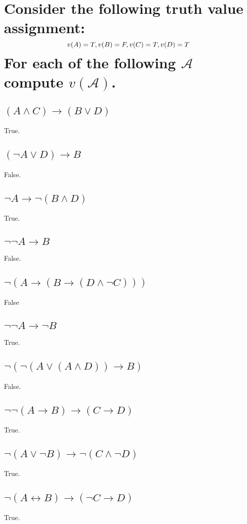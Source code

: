 \documentclass[10pt, letterpaper, titlepage]{article}
\newcommand{\A}{\mathscr{A}}
\newcommand{\lra}{\leftrightarrow}
\begin{document}
    \newpage
    \section{Consider the following truth value assignment:
        \[
            v(A) = T, v(B) = F,\\
            v(C) = T, v(D) = T
        \]
        For each of the following $\A$ compute $v(\A)$.}
        \begin{multicols}{2}
            \subsection{$(A \land C) \to  (B \lor  D)$}
                True.
            \subsection{$(\lnot A \lor  D) \to  B$}
                False.
            \subsection{$\lnot A \to  \lnot (B \land  D)$}
                True.
            \subsection{$\lnot \lnot A \to  B$}
                False.
            \subsection{$\lnot (A \to  (B \to  (D \land \lnot C)))$}
                False
            \subsection{$\lnot \lnot A \to  \lnot B$}
                True.
            \subsection{$\lnot (\lnot (A \lor  (A \land  D)) \to  B)$}
                False.
            \subsection{$\lnot \lnot (A \to  B) \to  (C \to  D)$}
                True.
            \subsection{$\lnot (A \lor  \lnot B) \to  \lnot (C \land  \lnot D)$}
                True.
            \subsection{$\lnot (A \lra  B) \to  (\lnot C \to  D)$}
                True.
        \end{multicols}
\end{document}
